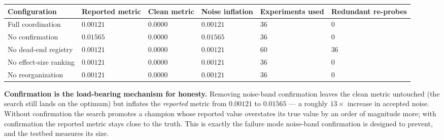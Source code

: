 \documentclass[
]{article}
\newcounter{none} %
\begin{document}
{\def\LTcaptype{none} %
\begin{longtable}[]{@{}
  >{\raggedright\arraybackslash}p{}
  >{\raggedright\arraybackslash}p{}
  >{\raggedright\arraybackslash}p{}
  >{\raggedright\arraybackslash}p{}
  >{\raggedright\arraybackslash}p{}
  >{\raggedright\arraybackslash}p{}@{}}
\toprule\noalign{}
\begin{minipage}[b]{\linewidth}\raggedright
Configuration
\end{minipage} & \begin{minipage}[b]{\linewidth}\raggedright
Reported metric
\end{minipage} & \begin{minipage}[b]{\linewidth}\raggedright
Clean metric
\end{minipage} & \begin{minipage}[b]{\linewidth}\raggedright
Noise inflation
\end{minipage} & \begin{minipage}[b]{\linewidth}\raggedright
Experiments used
\end{minipage} & \begin{minipage}[b]{\linewidth}\raggedright
Redundant re-probes
\end{minipage} \\
\midrule\noalign{}
\endhead
\bottomrule\noalign{}
\endlastfoot
Full coordination & \(0.00121\) & \(0.0000\) & \(0.00121\) & \(36\) &
\(0\) \\
No confirmation & \(0.01565\) & \(0.0000\) & \(0.01565\) & \(36\) &
\(0\) \\
No dead-end registry & \(0.00121\) & \(0.0000\) & \(0.00121\) & \(60\) &
\(36\) \\
No effect-size ranking & \(0.00121\) & \(0.0000\) & \(0.00121\) & \(36\)
& \(0\) \\
No reorganization & \(0.00121\) & \(0.0000\) & \(0.00121\) & \(36\) &
\(0\) \\
\end{longtable}
}

\textbf{Confirmation is the load-bearing mechanism for honesty.}
Removing noise-band confirmation leaves the clean metric untouched (the
search still lands on the optimum) but inflates the \emph{reported}
metric from \(0.00121\) to \(0.01565\) --- a roughly \(13\times\)
increase in accepted noise. Without confirmation the search promotes a
champion whose reported value overstates its true value by an order of
magnitude more; with confirmation the reported metric stays close to the
truth. This is exactly the failure mode noise-band confirmation is
designed to prevent, and the testbed measures its size.
\end{document}
